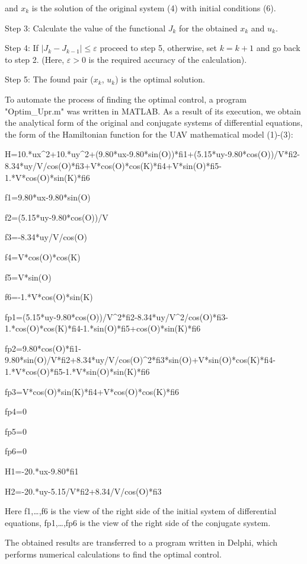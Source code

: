 and \(x_{k}\) is the solution of the original system (4) with initial
conditions (6).

Step 3: Calculate the value of the functional \(J_{k}\) for the obtained
\(x_{k}\) and \(u_{k}\).

Step 4: If \(\left| J_{k} - J_{k - 1} \right| \leq \varepsilon\) proceed
to step 5, otherwise, set \(k = k + 1\) and go back to step 2. (Here,
\(\varepsilon > 0\) is the required accuracy of the calculation).

Step 5: The found pair (\(x_{k}\), \(u_{k}\)) is the optimal solution.

To automate the process of finding the optimal control, a program
"Optim\_Upr.m" was written in MATLAB. As a result of its execution, we
obtain the analytical form of the original and conjugate systems of
differential equations, the form of the Hamiltonian function for the UAV
mathematical model (1)-(3):

H=10.*ux\^{}2+10.*uy\^{}2+(9.80*ux-9.80*sin(O))*fi1+(5.15*uy-9.80*cos(O))/V*fi2-8.34*uy/V/cos(O)*fi3+V*cos(O)*cos(K)*fi4+V*sin(O)*fi5-1.*V*cos(O)*sin(K)*fi6

f1=9.80*ux-9.80*sin(O)

f2=(5.15*uy-9.80*cos(O))/V

f3=-8.34*uy/V/cos(O)

f4=V*cos(O)*cos(K)

f5=V*sin(O)

f6=-1.*V*cos(O)*sin(K)

fp1=(5.15*uy-9.80*cos(O))/V\^{}2*fi2-8.34*uy/V\^{}2/cos(O)*fi3-1.*cos(O)*cos(K)*fi4-1.*sin(O)*fi5+cos(O)*sin(K)*fi6

fp2=9.80*cos(O)*fi1-9.80*sin(O)/V*fi2+8.34*uy/V/cos(O)\^{}2*fi3*sin(O)+V*sin(O)*cos(K)*fi4-1.*V*cos(O)*fi5-1.*V*sin(O)*sin(K)*fi6

fp3=V*cos(O)*sin(K)*fi4+V*cos(O)*cos(K)*fi6

fp4=0

fp5=0

fp6=0

H1=-20.*ux-9.80*fi1

H2=-20.*uy-5.15/V*fi2+8.34/V/cos(O)*fi3

Here f1,\ldots,f6 is the view of the right side of the initial system of
differential equations, fp1,\ldots,fp6 is the view of the right side of
the conjugate system.

The obtained results are transferred to a program written in Delphi,
which performs numerical calculations to find the optimal control.


